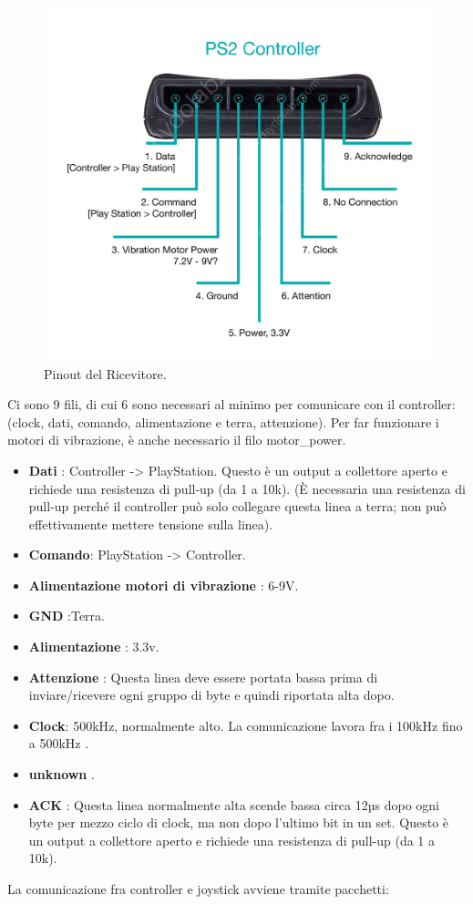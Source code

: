 \documentclass{article}
\begin{document}
\begin{figure}[H]
\centering
\includegraphics[width=0.7\linewidth]{image/ps2.jpg}
\caption{\label{ps2:pot}Pinout del Ricevitore.}
\end{figure}
Ci sono 9 fili, di cui 6 sono necessari al minimo per comunicare con il controller: (clock, dati, comando, alimentazione e terra, attenzione). Per far funzionare i motori di vibrazione, è anche necessario il filo motor\_power.

\begin{itemize}
    \item \textbf{Dati} : Controller -> PlayStation. Questo è un output a collettore aperto e richiede una resistenza di pull-up (da 1 a 10k). (È necessaria una resistenza di pull-up perché il controller può solo collegare questa linea a terra; non può effettivamente mettere tensione sulla linea).
    \item \textbf{Comando}: PlayStation -> Controller.
    \item \textbf{Alimentazione motori di vibrazione} : 6-9V.
    \item \textbf{GND} :Terra.
    \item \textbf{Alimentazione} : 3.3v.
    \item \textbf{Attenzione} : Questa linea deve essere portata bassa prima di inviare/ricevere ogni gruppo di byte e quindi riportata alta dopo.
    \item \textbf{Clock}: 500kHz, normalmente alto. La comunicazione lavora fra i 100kHz fino a 500kHz .
    \item \textbf{unknown} .
    \item \textbf{ACK} : Questa linea normalmente alta scende bassa circa 12µs dopo ogni byte per mezzo ciclo di clock, ma non dopo l'ultimo bit in un set. Questo è un output a collettore aperto e richiede una resistenza di pull-up (da 1 a 10k).
\end{itemize}
La comunicazione fra controller e joystick avviene tramite pacchetti:
\end{document}
